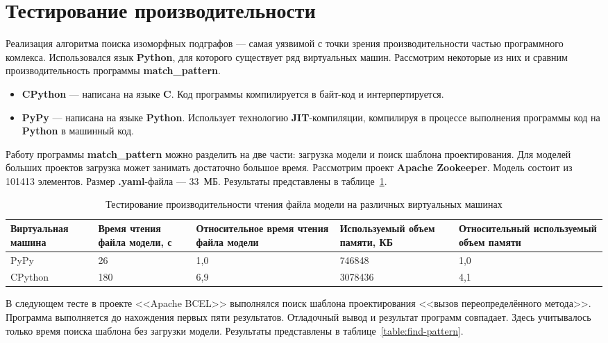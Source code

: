 \section{Тестирование производительности}

Реализация алгоритма поиска изоморфных подграфов --- самая уязвимой с точки
зрения производительности частью программного комлекса.
Использовался язык \textbf{Python}, для которого существует ряд виртуальных
машин.
Рассмотрим некоторые из них и сравним производительность программы
\textbf{match\_pattern}.

\begin{itemize}
\item \textbf{CPython} --- написана на языке \textbf{C}.
Код программы компилируется в байт-код и интерпертируется.
\item \textbf{PyPy} --- написана на языке \textbf{Python}.
Использует технологию \textbf{JIT}-компиляции, компилируя в процессе выполнения
программы код на \textbf{Python} в машинный код.
\end{itemize}

Работу программы \textbf{match\_pattern} можно разделить на две части:
загрузка модели и поиск шаблона проектирования.
Для моделей больших проектов загрузка может занимать достаточно большое время.
Рассмотрим проект \textbf{Apache Zookeeper}. Модель состоит из 101413 элементов.
Размер \textbf{.yaml}-файла --- 33~МБ.
Результаты представлены в таблице~\ref{table:read-model}.

\begin{table}[ht!]
    \centering
    \begin{tabularx}{\textwidth}{|X|X|X|X|X|}
        \hline
        Виртуальная машина & Время чтения файла модели, с & Относительное время чтения файла модели & Используемый объем памяти, КБ & Относительный используемый объем памяти \\
        \hline
        PyPy & 26 & 1,0 & 746848 & 1,0 \\
        \hline
        CPython & 180 & 6,9 & 3078436 & 4,1 \\
        \hline
    \end{tabularx}
    \caption{Тестирование производительности чтения файла модели на различных виртуальных машинах}
    \label{table:read-model}
\end{table}

В следующем тесте в проекте <<Apache BCEL>> выполнялся поиск шаблона
проектирования <<вызов переопределённого метода>>.
Программа выполняется до нахождения первых пяти результатов.
Отладочный вывод и результат программ совпадает.
Здесь учитывалось только время поиска шаблона без загрузки модели.
Результаты представлены в таблице~\ref{table:find-pattern}.

